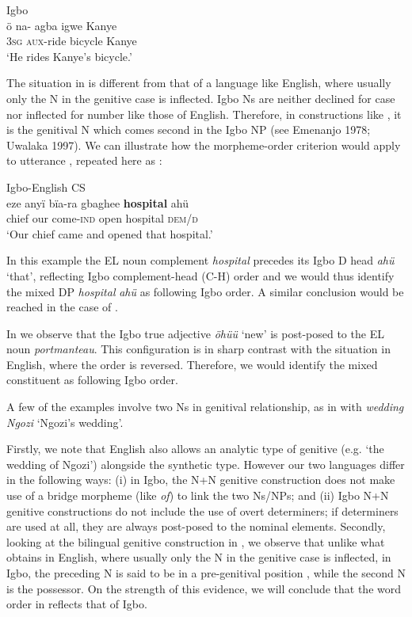 \documentclass[output=paper]{langsci/langscibook}
\begin{document}
\ea
{Igbo}\\
\gll ö    na- agba  \textsubscript{ }igwe    Kanye\\
     \textsc{3sg}    \textsc{aux}{}-ride  bicycle    Kanye\\
\glt ‘He rides Kanye’s bicycle.’
\z

The situation in  is different from that of a language like English, where usually only the N in the genitive case is inflected. Igbo Ns are neither declined for case nor inflected for number like those of English. Therefore, in constructions like , it is the genitival N which comes second in the Igbo NP (see Emenanjo 1978; Uwalaka 1997). We can illustrate how the morpheme-order criterion would apply to utterance , repeated here as :

\ea
{Igbo-English CS}\\
\gll eze    anyï  bïa-ra        gbaghee  \textbf{hospital  }ahü \textbf{ }\\
     chief   our  come-\textsc{ind}  open        hospital    \textsc{dem/d}\\
\glt ‘Our chief came and opened that hospital.’
\z

In this example the EL noun complement \textit{hospital }precedes its Igbo D head \textit{ahü} ‘that’, reflecting Igbo complement-head (C-H) order and we would thus identify the mixed DP \textit{hospital}\textbf{\textit{ }}\textit{ahü} as following Igbo order. A similar conclusion would be reached in the case of .

In  we observe that the Igbo true adjective \textit{öhüü }‘new’ is post-posed to the EL noun \textit{portmanteau}. This configuration is in sharp contrast with the situation in English, where the order is reversed. Therefore, we would identify the mixed constituent as following Igbo order. 

A few of the examples involve two Ns in genitival relationship, as in  with \textit{wedding Ngozi }‘Ngozi’s wedding’. 

Firstly, we note that English also allows an analytic type of genitive (e.g. ‘the wedding of Ngozi’) alongside the synthetic type. However our two languages differ in the following ways: (i) in Igbo, the N+N genitive construction does not make use of a bridge morpheme (like \textit{of}) to link the two Ns/NPs; and (ii) Igbo N+N genitive constructions do not include the use of overt determiners; if determiners are used at all, they are always post-posed to the nominal elements. Secondly, looking at the bilingual genitive construction in , we observe that unlike what obtains in English, where usually only the N in the genitive case is inflected, in Igbo, the preceding N is said to be in a pre-genitival position \citep{Uwalaka1997}, while the second N is the possessor. On the strength of this evidence, we will conclude that the word order in  reflects that of Igbo. 
\end{document}
